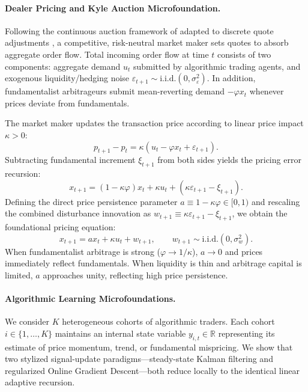 \documentclass[12pt]{article}
\theoremstyle{definition}
\theoremstyle{remark}
\newcommand{\R}{\mathbb{R}}
\begin{document}
\paragraph{Dealer Pricing and Kyle Auction Microfoundation.}
Following the continuous auction framework of \citet{kyle1985continuous} adapted to discrete quote adjustments \citep{hasbrouck1991,bouchaud2004fluctuations}, a competitive, risk-neutral market maker sets quotes to absorb aggregate order flow. Total incoming order flow at time $t$ consists of two components: aggregate demand $u_t$ submitted by algorithmic trading agents, and exogenous liquidity/hedging noise $\varepsilon_{t+1} \sim \text{i.i.d.}(0, \sigma_\varepsilon^2)$. In addition, fundamentalist arbitrageurs submit mean-reverting demand $-\varphi x_t$ whenever prices deviate from fundamentals.

The market maker updates the transaction price according to linear price impact $\kappa > 0$:
\begin{equation}
p_{t+1} - p_t = \kappa \left( u_t - \varphi x_t + \varepsilon_{t+1} \right).
\end{equation}
Subtracting fundamental increment $\xi_{t+1}$ from both sides yields the pricing error recursion:
\begin{equation}
x_{t+1} = (1 - \kappa \varphi) x_t + \kappa u_t + \left( \kappa \varepsilon_{t+1} - \xi_{t+1} \right).
\end{equation}
Defining the direct price persistence parameter $a \equiv 1 - \kappa \varphi \in [0, 1)$ and rescaling the combined disturbance innovation as $w_{t+1} \equiv \kappa \varepsilon_{t+1} - \xi_{t+1}$, we obtain the foundational pricing equation:
\begin{equation}
x_{t+1} = a x_t + \kappa u_t + w_{t+1}, \qquad w_{t+1} \sim \text{i.i.d.}(0, \sigma_w^2).
\label{eq:micro_pricing}
\end{equation}
When fundamentalist arbitrage is strong ($\varphi \to 1/\kappa$), $a \to 0$ and prices immediately reflect fundamentals. When liquidity is thin and arbitrage capital is limited, $a$ approaches unity, reflecting high price persistence.

\paragraph{Algorithmic Learning Microfoundations.}
We consider $K$ heterogeneous cohorts of algorithmic traders. Each cohort $i \in \{1, \dots, K\}$ maintains an internal state variable $y_{i,t} \in \R$ representing its estimate of price momentum, trend, or fundamental mispricing. We show that two stylized signal-update paradigms—steady-state Kalman filtering and regularized Online Gradient Descent—both reduce locally to the identical linear adaptive recursion.
\end{document}
